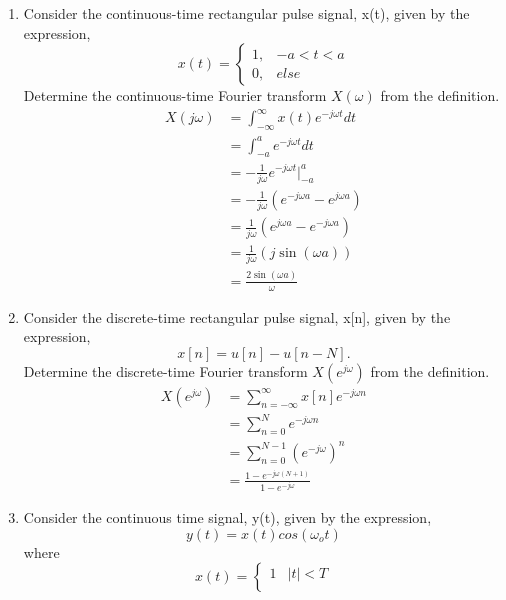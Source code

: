 \documentclass{article}
\begin{document}
\begin{enumerate}
    \item Consider the continuous-time rectangular pulse signal, x(t), given by the expression,
    \begin{equation}
        x(t) = \begin{cases}
        1, & -a < t < a \\
        0, & else
        \end{cases}
    \end{equation}
    Determine the continuous-time Fourier transform $X(\omega)$ from the definition.
    \begin{align}
        X(j\omega) &= \int_{-\infty}^\infty x(t) e^{-j\omega t}dt\\
        &= \int_{-a}^a e^{-j\omega t}dt\\
        &= -\frac{1}{j\omega} e^{-j\omega t}\bigg|_{-a}^a\\
        &= -\frac{1}{j\omega} (e^{-j\omega a}-e^{j\omega a})\\
        &= \frac{1}{j\omega} (e^{j\omega a}-e^{-j\omega a})\\
        &= \frac{1}{j\omega} (j\sin(\omega a))\\
        &= \boxed{\frac{2\sin(\omega a)}{\omega}}
    \end{align}
    \newpage
    \item Consider the discrete-time rectangular pulse signal, x[n], given by the expression,
    \begin{equation}
        x[n] = u[n] -u[n-N].
    \end{equation}
    Determine the discrete-time Fourier transform $X(e^{j\omega})$ from the definition.
    \begin{align}
        X(e^{j\omega}) &= \sum_{n=-\infty}^\infty x[n]e^{-j\omega n}\\
        &= \sum_{n=0}^N e^{-j\omega n}\\
        &= \sum_{n=0}^{N-     1} (e^{-j\omega})^n\\
        &= \boxed{\frac{1-e^{-j\omega(N+1)}}{1-e^{-j\omega}}}
    \end{align}
    \newpage
    \item Consider the  continuous time signal, y(t), given by the expression,
    \begin{equation}
        y(t) = x(t)cos(\omega_ot)
    \end{equation}
    where
    \begin{equation}
        x(t) = \begin{cases}
        1 & |t| < T\\

\end{cases}
\end{equation}
\end{enumerate}
\end{document}
